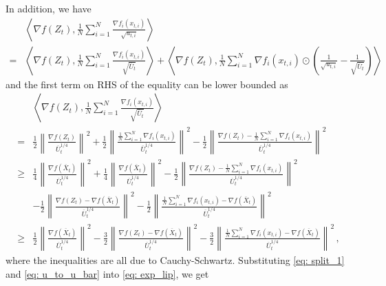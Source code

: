 \documentclass[11pt]{article}
\begin{document}
In addition, we have 
\begin{align}\label{eq: u_to_u_bar}
&\left \langle \nabla f( Z_{t}), \frac{1}{N} \sum_{i=1}^N \frac{\nabla f_i(x_{t,i})}{\sqrt{u_{t,i}}}  \right \rangle  \nonumber \\
= &  \left \langle \nabla f( Z_{t}), \frac{1}{N} \sum_{i=1}^N \frac{\nabla f_i( x_{t,i})}{\sqrt{\overline U_{t}}}  \right \rangle  +\left \langle \nabla f( Z_{t}), \frac{1}{N} \sum_{i=1}^N \nabla f_i( x_{t,i})\odot \left(\frac{1}{\sqrt{u_{t,i}}} - \frac{1}{\sqrt{\overline U_{t}}}  \right)  \right \rangle 
\end{align}
and the first term on RHS of the equality can be lower bounded as 
\begin{align} \label{eq: split_1}
&\left \langle \nabla f( Z_{t}), \frac{1}{N} \sum_{i=1}^N \frac{\nabla f_i( x_{t,i})}{\sqrt{\overline U_{t}}}  \right \rangle \nonumber \\
= &\frac{1}{2} \left\|\frac{\nabla f( Z_{t})}{\overline U_{t}^{1/4}}\right\|^2 + \frac{1}{2}\left\|  \frac{\frac{1}{N}\sum_{i=1}^N \nabla f_i( x_{t,i}) }{\overline U_{t}^{1/4}}  \right\|^2 - \frac{1}{2 }\left\| \frac{\nabla f( Z_{t}) -\frac{1}{N}\sum_{i=1}^N \nabla f_i( x_{t,i})}{\overline U_{t}^{1/4}} \right\|^2 \nonumber \\
\geq & \frac{1}{4} \left\|\frac{\nabla f( \overline X_{t})}{\overline U_{t}^{1/4}}\right\|^2 + \frac{1}{4}\left\|  \frac{ \nabla f( \overline X_{t})}{\overline U_{t}^{1/4}}  \right\|^2 - \frac{1}{2 }\left\| \frac{\nabla f( Z_{t}) -\frac{1}{N}\sum_{i=1}^N \nabla f_i( x_{t,i})}{\overline U_{t}^{1/4}} \right\|^2  \nonumber \\
&- \frac{1}{2} \left\|\frac{\nabla f( Z_{t}) -\nabla f( \overline X_{t})}{\overline U_{t}^{1/4}}\right\|^2 - \frac{1}{2} \left\|  \frac{ \frac{1}{N}\sum_{i=1}^N \nabla f_i( x_{t,i}) -  \nabla f( \overline X_{t})}{\overline U_{t}^{1/4}}  \right\|^2 \nonumber \\
\geq & \frac{1}{2} \left\|\frac{\nabla f( \overline X_{t})}{\overline U_{t}^{1/4}}\right\|^2   - \frac{3}{2} \left\|\frac{\nabla f( Z_{t}) -\nabla f( \overline X_{t})}{\overline U_{t}^{1/4}}\right\|^2 - \frac{3}{2} \left\|  \frac{ \frac{1}{N}\sum_{i=1}^N \nabla f_i( x_{t,i}) -  \nabla f( \overline X_{t})}{\overline U_{t}^{1/4}}  \right\|^2 \, ,
\end{align}
where the inequalities are all due to Cauchy-Schwartz.
Substituting \eqref{eq: split_1} and \eqref{eq: u_to_u_bar} into \eqref{eq: exp_lip}, we get
\end{document}
